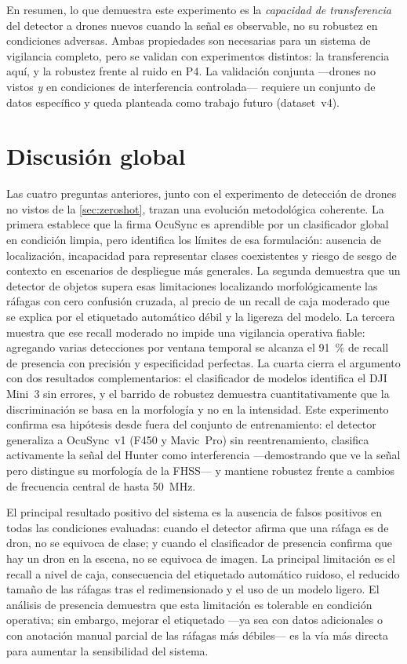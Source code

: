 En resumen, lo que demuestra este experimento es la \emph{capacidad de transferencia} del detector a drones nuevos cuando la señal es observable, no su robustez en condiciones adversas. Ambas propiedades son necesarias para un sistema de vigilancia completo, pero se validan con experimentos distintos: la transferencia aquí, y la robustez frente al ruido en P4. La validación conjunta ---drones no vistos \emph{y} en condiciones de interferencia controlada--- requiere un conjunto de datos específico y queda planteada como trabajo futuro (dataset~v4).

\section{Discusión global}
\label{sec:discusion}

Las cuatro preguntas anteriores, junto con el experimento de detección de drones no vistos de la \cref{sec:zeroshot}, trazan una evolución metodológica coherente. La primera establece que la firma OcuSync es aprendible por un clasificador global en condición limpia, pero identifica los límites de esa formulación: ausencia de localización, incapacidad para representar clases coexistentes y riesgo de sesgo de contexto en escenarios de despliegue más generales. La segunda demuestra que un detector de objetos supera esas limitaciones localizando morfológicamente las ráfagas con cero confusión cruzada, al precio de un recall de caja moderado que se explica por el etiquetado automático débil y la ligereza del modelo. La tercera muestra que ese recall moderado no impide una vigilancia operativa fiable: agregando varias detecciones por ventana temporal se alcanza el \SI{91}{\percent} de recall de presencia con precisión y especificidad perfectas. La cuarta cierra el argumento con dos resultados complementarios: el clasificador de modelos identifica el DJI Mini~3 sin errores, y el barrido de robustez demuestra cuantitativamente que la discriminación se basa en la morfología y no en la intensidad. Este experimento confirma esa hipótesis desde fuera del conjunto de entrenamiento: el detector generaliza a OcuSync~v1 (F450 y Mavic~Pro) sin reentrenamiento, clasifica activamente la señal del Hunter como interferencia ---demostrando que ve la señal pero distingue su morfología de la FHSS--- y mantiene robustez frente a cambios de frecuencia central de hasta \SI{50}{\mega\hertz}.

El principal resultado positivo del sistema es la ausencia de falsos positivos en todas las condiciones evaluadas: cuando el detector afirma que una ráfaga es de dron, no se equivoca de clase; y cuando el clasificador de presencia confirma que hay un dron en la escena, no se equivoca de imagen. La principal limitación es el recall a nivel de caja, consecuencia del etiquetado automático ruidoso, el reducido tamaño de las ráfagas tras el redimensionado y el uso de un modelo ligero. El análisis de presencia demuestra que esta limitación es tolerable en condición operativa; sin embargo, mejorar el etiquetado ---ya sea con datos adicionales o con anotación manual parcial de las ráfagas más débiles--- es la vía más directa para aumentar la sensibilidad del sistema.

